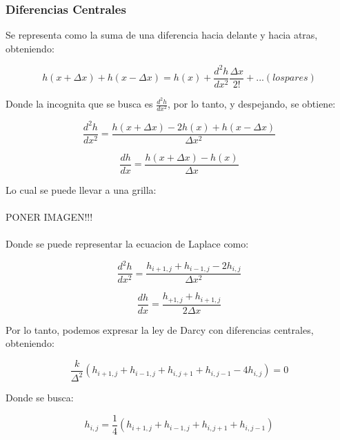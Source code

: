 \subsubsection{Diferencias Centrales}

Se representa como la suma de una diferencia hacia delante y hacia atras, obteniendo:

\begin{equation}
    h(x + \Delta x) + h(x - \Delta x) = h(x) + \frac{d^2h}{dx^2}\frac{\Delta x}{2!} + ...(los pares)
\end{equation}

Donde la incognita que se busca es $\frac{d^2h}{dx^2}$, por lo tanto, y despejando, se obtiene:

\begin{equation}
    \frac{d^2h}{dx^2} = \frac{h(x + \Delta x) - 2h(x) + h(x - \Delta x)}{\Delta x^2}
\end{equation}

\begin{equation}
    \frac{dh}{dx} = \frac{h(x + \Delta x) - h(x)}{\Delta x}
\end{equation}

Lo cual se puede llevar a una grilla:
\\ \\
PONER IMAGEN!!!
\\ \\
Donde se puede representar la ecuacion de Laplace como:

\begin{equation}
    \frac{d^2h}{dx^2} = \frac{h_{i+1,j} + h_{i-1,j} - 2h_{i,j}}{\Delta x^2}
\end{equation}

\begin{equation}
    \frac{dh}{dx} = \frac{h_{+1,j} + h_{i+1,j} }{2\Delta x}
\end{equation}

Por lo tanto, podemos expresar la ley de Darcy con diferencias centrales, obteniendo:

\begin{equation}
    \frac{k}{\Delta^2}(h_{i+1,j} + h_{i-1,j} + h_{i,j+1} + h_{i,j-1} - 4h_{i,j}) = 0
\end{equation}

Donde se busca:

\begin{equation}
    h_{i,j} = \frac{1}{4}(h_{i+1,j} + h_{i-1,j} + h_{i,j+1} + h_{i,j-1})
\end{equation}

